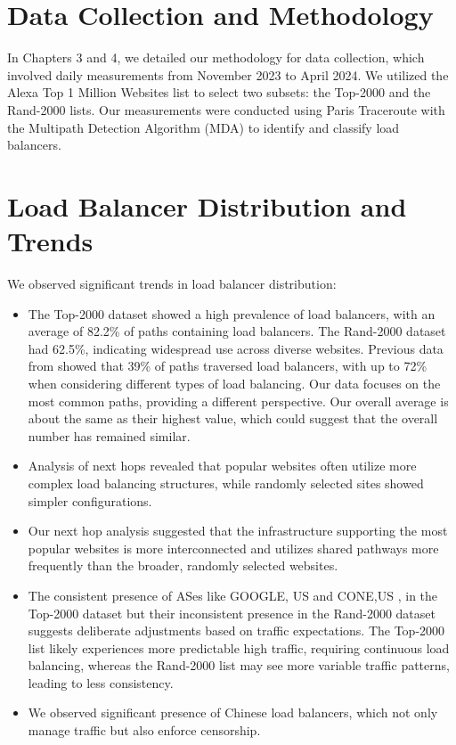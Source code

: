 \documentclass[12pt]{cwru_thesis}
\begin{document}
\section*{Data Collection and Methodology}

In Chapters 3 and 4, we detailed our methodology for data collection, which involved daily measurements from November 2023 to April 2024. We utilized the Alexa Top 1 Million Websites list to select two subsets: the Top-2000 and the Rand-2000 lists. Our measurements were conducted using Paris Traceroute with the Multipath Detection Algorithm (MDA) to identify and classify load balancers.

\section*{Load Balancer Distribution and Trends}

We observed significant trends in load balancer distribution:
\begin{itemize}
    \item The Top-2000 dataset showed a high prevalence of load balancers, with an average of 82.2\% of paths containing load balancers. The Rand-2000 dataset had 62.5\%, indicating widespread use across diverse websites. Previous data from  \cite{augustin2010measuring} showed that 39\% of paths traversed load balancers, with up to 72\% when considering different types of load balancing. Our data focuses on the most common paths, providing a different perspective. Our overall average is about the same as their highest value, which could suggest that the overall number has remained similar.
    \item Analysis of next hops revealed that popular websites often utilize more complex load balancing structures, while randomly selected sites showed simpler configurations.
    \item Our next hop analysis suggested that the infrastructure supporting the most popular websites is more interconnected and utilizes shared pathways more frequently than the broader, randomly selected websites.
    \item The consistent presence of ASes like GOOGLE, US and CONE,US , in the Top-2000 dataset but their inconsistent presence in the Rand-2000 dataset suggests deliberate adjustments based on traffic expectations. The Top-2000 list likely experiences more predictable high traffic, requiring continuous load balancing, whereas the Rand-2000 list may see more variable traffic patterns, leading to less consistency.
    \item We observed significant presence of Chinese load balancers, which not only manage traffic but also enforce censorship.
\end{itemize}
\end{document}
